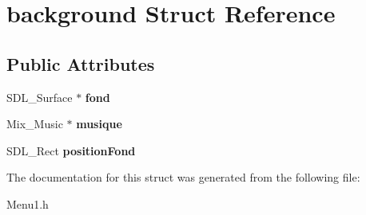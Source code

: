 \hypertarget{structbackground}{}\section{background Struct Reference}
\label{structbackground}
\subsection*{Public Attributes}
\begin{DoxyCompactItemize}
\item 
\mbox{\label{structbackground_a3f481de34cfa3f9538aa074589823614}} 
S\+D\+L\+\_\+\+Surface $\ast$ {\bfseries fond}
\item 
\mbox{\label{structbackground_ad986c299e38f559476b1d5d3f1b4ea99}} 
Mix\+\_\+\+Music $\ast$ {\bfseries musique}
\item 
\mbox{\label{structbackground_a7adc1acf00dd3f9425a98205a0ea9c0a}} 
S\+D\+L\+\_\+\+Rect {\bfseries position\+Fond}
\end{DoxyCompactItemize}


The documentation for this struct was generated from the following file\+:\begin{DoxyCompactItemize}
\item 
Menu1.\+h\end{DoxyCompactItemize}
